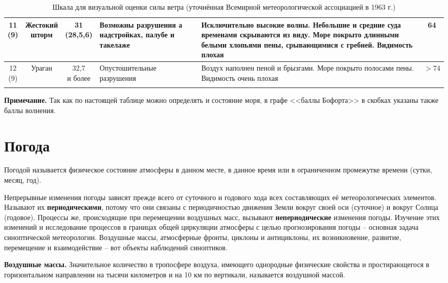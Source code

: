 {\begin{longtable}{c|c|c|p{}|p{}|c}
    \midrule
    \shortstack{11\\(9)} &  \shortstack{Жестокий\\шторм} & \shortstack{31\\(28,5\otdo 32,6)} & Возможны разрушения а надстройках, палубе и такелаже & Исключительно высокие волны. Небольшие и средние суда временами скрываются из виду. Море покрыто длинными белыми хлопьями пены, срывающимися с гребней. Видимость плохая & 64 \\
    \midrule
    \shortstack{12\\(9)} & Ураган & \shortstack{32,7\\и более} & Опустошительные разрушения & Воздух наполнен пеной и брызгами. Море покрыто полосами пены. Видимость очень плохая & $>74$ \\
    \bottomrule
    \caption{Шкала для визуальной оценки силы ветра (уточнённая Всемирной метеорологической ассоциацией в 1963 г.)}
    \label{tab:6}
  \end{longtable}

  {\small \textbf{Примечание.} Так как по настоящей таблице можно
  определять и состояние моря, в графе <<баллы Бофорта>> в скобках
  указаны также баллы волнения.}
}
  \twocolumn

\section{Погода}

Погодой называется физическое состояние атмосферы в данном месте, в
данное время или в ограниченном промежутке времени (сутки, месяц,
год).

Непрерывные изменения погоды зависят прежде всего от суточного и
годового хода всех составляющих её метеорологических
элементов. Называют их \textbf{периодическими}, потому что они связаны
с периодичностью движения Земли вокруг своей оси (суточное) и вокруг
Солнца (годовое). Процессы же, происходящие при перемещении воздушных
масс, вызывают \textbf{непериодические} изменения погоды. Изучение
этих изменений и исследование процессов в границах общей циркуляции
атмосферы с целью прогнозирования погоды \--- основная задача
синоптической метеорологии. Воздушные массы, атмосферные фронты,
циклоны и антициклоны, их возникновение, развитие, перемещение и
взаимодействие \--- вот объекты наблюдений синоптиков.

\textbf{Воздушные массы.} Значительное
количество в тропосфере воздуха, имеющего однородные физические
свойства и простирающегося в горизонтальном направлении на тысячи
километров и на 10 км по вертикали, называется воздушной
массой.

